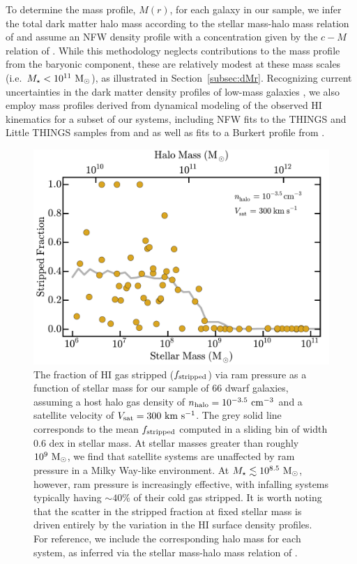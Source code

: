 \documentclass[usenatbib]{mn2e}
\newcommand{\mstar}{{M}_{\star}}
\newcommand{\msun}{{\rm M}_{\odot}}
\begin{document}
To determine the mass profile, $M(r)$, for each galaxy in our sample,
we infer the total dark matter halo mass according to the stellar
mass-halo mass relation of \citet{gk14} and assume an NFW density
profile \citep{nfw97} with a concentration given by the $c-M$ relation
of \citet{klypin11}.
%
While this methodology neglects contributions to the mass profile from
the baryonic component, these are relatively modest at these mass
scales (i.e.~$\mstar < 10^{11}~\msun$), as illustrated in
Section~\ref{subsec:dMr}.
%
Recognizing current uncertainties in the dark matter density profiles
of low-mass galaxies \citep[e.g.][]{moore94, deblok01, bk11, bk12}, we
also employ mass profiles derived from dynamical modeling of the
observed H{\scriptsize I} kinematics for a subset of our systems,
including NFW fits to the THINGS and Little THINGS samples from
\citet{deblok08} and \citet{oh15} as well as fits to a Burkert profile
\citep{burkert95} from \citet{pace16}.



\begin{figure}
 \centering
 \hspace*{-0.2in}
 \includegraphics[width=5.0in]{f3.pdf}
 \caption{The fraction of H{\scriptsize I} gas stripped ($f_{\rm
     stripped}$) via ram pressure as a function of stellar mass for
   our sample of $66$ dwarf galaxies, assuming a host halo gas density
   of $n_{\rm halo} = 10^{-3.5}~{\rm cm}^{-3}$ and a satellite
   velocity of $V_{\rm sat}=300~{\rm km}~{\rm s}^{-1}$. The grey solid
   line corresponds to the mean $f_{\rm stripped}$ computed in a
   sliding bin of width $0.6$ dex in stellar mass. At stellar masses
   greater than roughly $10^{9}~\msun$, we find that satellite systems
   are unaffected by ram pressure in a Milky Way-like environment. At
   $\mstar \lesssim 10^{8.5}~\msun$, however, ram pressure is
   increasingly effective, with infalling systems typically having
   $\sim 40\%$ of their cold gas stripped. It is worth noting that the
   scatter in the stripped fraction at fixed stellar mass is driven
   entirely by the variation in the H{\scriptsize I} surface density
   profiles. For reference, we include
   the corresponding halo mass for each system, as inferred via the
   stellar mass-halo mass relation of \citet{gk14}.}
\label{fig:fid}
\end{figure}
\end{document}
